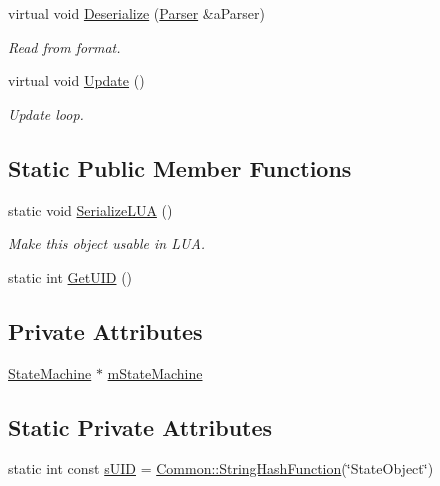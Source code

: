 \begin{DoxyCompactItemize}
virtual void \hyperlink{classStateObject_af2cc01c2dc3583199d3a05820dde68e1}{Deserialize} (\hyperlink{classParser}{Parser} \&a\+Parser)
\begin{DoxyCompactList}\small\item\em Read from format. \end{DoxyCompactList}\item 
virtual void \hyperlink{classStateObject_a3fcf36666733125f1e6eae7f0f654db4}{Update} ()
\begin{DoxyCompactList}\small\item\em Update loop. \end{DoxyCompactList}\end{DoxyCompactItemize}
\subsection*{Static Public Member Functions}
\begin{DoxyCompactItemize}
\item 
static void \hyperlink{classStateObject_a03bb2c50e82e3a8fe22ba1460cd68726}{Serialize\+L\+UA} ()
\begin{DoxyCompactList}\small\item\em Make this object usable in L\+UA. \end{DoxyCompactList}\item 
static int \hyperlink{classStateObject_ac808ea2d8b81190c3103131f1f30e8f1}{Get\+U\+ID} ()
\end{DoxyCompactItemize}
\subsection*{Private Attributes}
\begin{DoxyCompactItemize}
\item 
\hyperlink{classStateMachine}{State\+Machine} $\ast$ \hyperlink{classStateObject_aa33d984d1ab329928d9e747856493e6e}{m\+State\+Machine}
\end{DoxyCompactItemize}
\subsection*{Static Private Attributes}
\begin{DoxyCompactItemize}
\item 
static int const \hyperlink{classStateObject_a13bb8cd307785ed2284f7f2a421a3be9}{s\+U\+ID} = \hyperlink{namespaceCommon_a994c43a8ea7b03968186a635687a6521}{Common\+::\+String\+Hash\+Function}(\char`\"{}State\+Object\char`\"{})
\end{DoxyCompactItemize}



